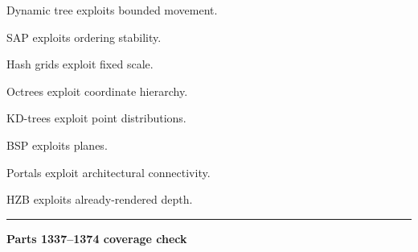 Dynamic tree exploits bounded movement.

SAP exploits ordering stability.

Hash grids exploit fixed scale.

Octrees exploit coordinate hierarchy.

KD-trees exploit point distributions.

BSP exploits planes.

Portals exploit architectural connectivity.

HZB exploits already-rendered depth.

\begin{center}\rule{0.5\linewidth}{0.5pt}\end{center}

\textbf{Parts 1337--1374 coverage check}


